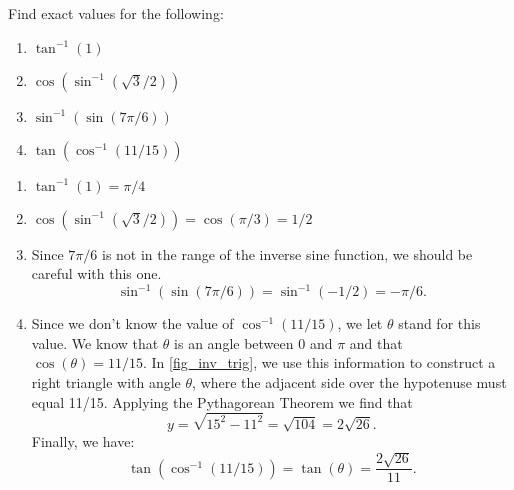 \begin{example}\label{eg_inv_trig}%
Find exact values for the following:
\\
\begin{minipage}{.5\linewidth}
\begin{enumerate}
 \item $\tan^{-1}(1)$
 \item $\cos(\sin^{-1}(\sqrt3/2))$
\end{enumerate}
\end{minipage}%
\begin{minipage}{.5\linewidth}
\begin{enumerate}
 \setcounter{enumi}{2}
 \item $\sin^{-1}(\sin(7\pi/6))$
 \item $\tan(\cos^{-1}(11/15))$
\end{enumerate}
\end{minipage}
\solution
\begin{enumerate}
\item $\tan^{-1}(1)=\pi/4$
\item $\cos(\sin^{-1}(\sqrt3/2))=\cos(\pi/3)=1/2$
\item Since $7\pi/6$ is not in the range of the inverse sine function, we should be careful with this one.
\[\sin^{-1}(\sin(7\pi/6))=\sin^{-1}(-1/2)=-\pi/6.\]
\item Since we don't know the value of $\cos^{-1}(11/15)$, we let $\theta$ stand for this value. We know that $\theta$ is an angle between $0$ and $\pi$ and that $\cos(\theta)=11/15$.
In \autoref{fig_inv_trig}, we use this information to construct a right triangle with angle $\theta$, where the adjacent side over the hypotenuse must equal 11/15. Applying the Pythagorean Theorem we find that
\[y=\sqrt{15^2-11^2}=\sqrt{104}=2\sqrt{26}.\]
Finally, we have:
\[\tan(\cos^{-1}(11/15))=\tan(\theta)=\frac{2\sqrt{26}}{11}.\]
\end{enumerate}
\end{example}



